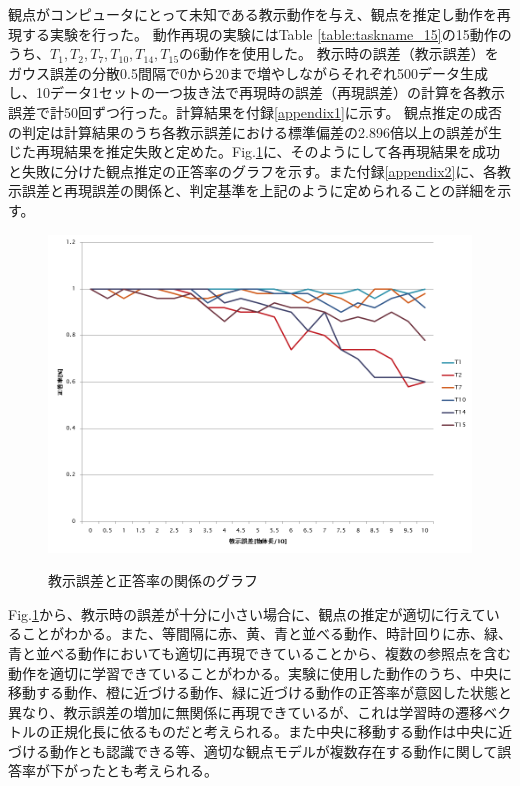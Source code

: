 観点がコンピュータにとって未知である教示動作を与え、観点を推定し動作を再現する実験を行った。
動作再現の実験にはTable \ref{table:taskname_15}の15動作のうち、$T_{1} , T_{2} , T_{7} , T_{10} , T_{14} , T_{15}$の6動作を使用した。
教示時の誤差（教示誤差）をガウス誤差の分散0.5間隔で0から20まで増やしながらそれぞれ500データ生成し、10データ1セットの一つ抜き法で再現時の誤差（再現誤差）の計算を各教示誤差で計50回ずつ行った。計算結果を付録\ref{appendix1}に示す。
観点推定の成否の判定は計算結果のうち各教示誤差における標準偏差の2.896倍以上の誤差が生じた再現結果を推定失敗と定めた。Fig.\ref{figure:success_rate}に、そのようにして各再現結果を成功と失敗に分けた観点推定の正答率のグラフを示す。また付録\ref{appendix2}に、各教示誤差と再現誤差の関係と、判定基準を上記のように定められることの詳細を示す。
	\begin{figure}[h]
		\begin{center}
			\includegraphics[width=14cm]{chart2.png} \\ %
			\caption{教示誤差と正答率の関係のグラフ}
			\label{figure:success_rate}
		\end{center}
	\end{figure}

Fig.\ref{figure:success_rate}から、教示時の誤差が十分に小さい場合に、観点の推定が適切に行えていることがわかる。また、等間隔に赤、黄、青と並べる動作、時計回りに赤、緑、青と並べる動作においても適切に再現できていることから、複数の参照点を含む動作を適切に学習できていることがわかる。実験に使用した動作のうち、中央に移動する動作、橙に近づける動作、緑に近づける動作の正答率が意図した状態と異なり、教示誤差の増加に無関係に再現できているが、これは学習時の遷移ベクトルの正規化長に依るものだと考えられる。また中央に移動する動作は中央に近づける動作とも認識できる等、適切な観点モデルが複数存在する動作に関して誤答率が下がったとも考えられる。




